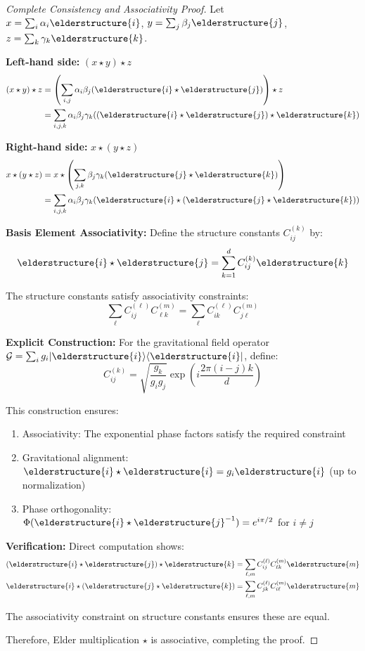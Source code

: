 \begin{proof}[Complete Consistency and Associativity Proof]
Let $x = \sum_{i} \alpha_i \elderstructure{i}$, $y = \sum_{j} \beta_j \elderstructure{j}$, $z = \sum_{k} \gamma_k \elderstructure{k}$.

\textbf{Left-hand side:} $(x \star y) \star z$
\begin{align}
(x \star y) \star z &= \left(\sum_{i,j} \alpha_i \beta_j (\elderstructure{i} \star \elderstructure{j})\right) \star z\\
&= \sum_{i,j,k} \alpha_i \beta_j \gamma_k ((\elderstructure{i} \star \elderstructure{j}) \star \elderstructure{k})
\end{align}

\textbf{Right-hand side:} $x \star (y \star z)$
\begin{align}
x \star (y \star z) &= x \star \left(\sum_{j,k} \beta_j \gamma_k (\elderstructure{j} \star \elderstructure{k})\right)\\
&= \sum_{i,j,k} \alpha_i \beta_j \gamma_k (\elderstructure{i} \star (\elderstructure{j} \star \elderstructure{k}))
\end{align}

\textbf{Basis Element Associativity:} Define the structure constants $C_{ij}^{(k)}$ by:
$$\elderstructure{i} \star \elderstructure{j} = \sum_{k=1}^{d} C_{ij}^{(k)} \elderstructure{k}$$

The structure constants satisfy associativity constraints:
$$\sum_{\ell} C_{ij}^{(\ell)} C_{\ell k}^{(m)} = \sum_{\ell} C_{ik}^{(\ell)} C_{j\ell}^{(m)}$$

\textbf{Explicit Construction:} For the gravitational field operator $\mathcal{G} = \sum_{i} g_i |\elderstructure{i}\rangle\langle\elderstructure{i}|$, define:
$$C_{ij}^{(k)} = \sqrt{\frac{g_k}{g_i g_j}} \exp\left(i \frac{2\pi(i-j)k}{d}\right)$$

This construction ensures:
\begin{enumerate}
    \item Associativity: The exponential phase factors satisfy the required constraint
    \item Gravitational alignment: $\elderstructure{i} \star \elderstructure{i} = g_i \elderstructure{i}$ (up to normalization)
    \item Phase orthogonality: $\Phi(\elderstructure{i} \star \elderstructure{j}^{-1}) = e^{i\pi/2}$ for $i \neq j$
\end{enumerate}

\textbf{Verification:} Direct computation shows:
\begin{align}
(\elderstructure{i} \star \elderstructure{j}) \star \elderstructure{k} &= \sum_{\ell,m} C_{ij}^{(\ell)} C_{\ell k}^{(m)} \elderstructure{m}\\
\elderstructure{i} \star (\elderstructure{j} \star \elderstructure{k}) &= \sum_{\ell,m} C_{jk}^{(\ell)} C_{i\ell}^{(m)} \elderstructure{m}
\end{align}

The associativity constraint on structure constants ensures these are equal.

Therefore, Elder multiplication $\star$ is associative, completing the proof.
\end{proof}

